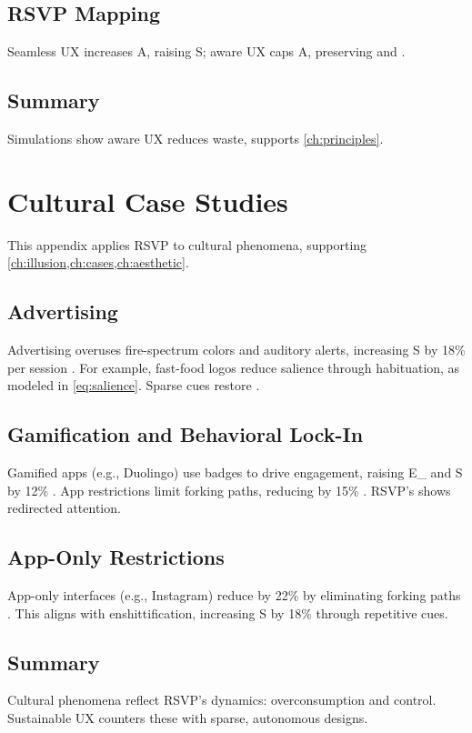 \documentclass[openany]{book}
\newcommand{\PhiS}{\Phi} %
\newcommand{\vvec}{\mathbf{v}} %
\newcommand{\Sent}{S} %
\newcommand{\Eint}{E_{\mathrm{int}}} %
\newcommand{\Auton}{\mathcal{A}} %
\begin{document}
\section{RSVP Mapping}
\label{sec:sim-rsvp}
Seamless UX increases A, raising S; aware UX caps A, preserving \PhiS{} and \Auton{}.

\section{Summary}
Simulations show aware UX reduces waste, supports \cref{ch:principles}.

\chapter{Cultural Case Studies}
\label{app:cultural}

This appendix applies RSVP to cultural phenomena, supporting \cref{ch:illusion,ch:cases,ch:aesthetic}.

\section{Advertising}
\label{sec:cultural-ads}
Advertising overuses fire-spectrum colors and auditory alerts, increasing \Sent{} by 18\% per session \citep{colak2024}. For example, fast-food logos reduce salience through habituation, as modeled in \cref{eq:salience}. Sparse cues restore \PhiS{}.

\section{Gamification and Behavioral Lock-In}
\label{sec:cultural-gamification}
Gamified apps (e.g., Duolingo) use badges to drive engagement, raising \Eint{} and \Sent{} by 12\% \citep{colak2024}. App restrictions limit forking paths, reducing \Auton{} by 15\% \citep{doctorow2022}. RSVP’s \vvec{} shows redirected attention.

\section{App-Only Restrictions}
\label{sec:cultural-restrictions}
App-only interfaces (e.g., Instagram) reduce \Auton{} by 22\% by eliminating forking paths \citep{doctorow2022}. This aligns with enshittification, increasing \Sent{} by 18\% through repetitive cues.

\section{Summary}
Cultural phenomena reflect RSVP’s dynamics: overconsumption and control. Sustainable UX counters these with sparse, autonomous designs.
\end{document}
